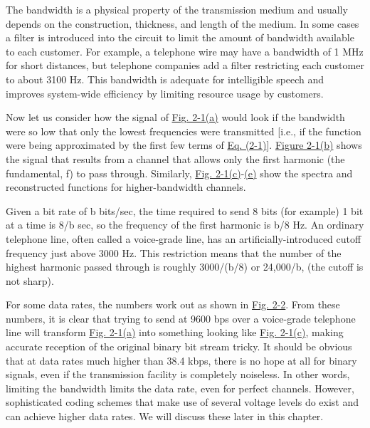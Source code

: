 \documentclass[b5paper,11pt]{memoir}
\begin{document}
The bandwidth is a physical property of the transmission medium and
usually depends on the construction, thickness, and length of the
medium. In some cases a filter is introduced into the circuit to limit
the amount of bandwidth available to each customer. For example, a
telephone wire may have a bandwidth of 1 MHz for short distances, but
telephone companies add a filter restricting each customer to about 3100
Hz. This bandwidth is adequate for intelligible speech and improves
system-wide efficiency by limiting resource usage by customers.

Now let us consider how the signal of
\protect\hyperlink{0130661023_ch02lev1sec1.htmlux5cux23ch02fig01}{Fig.
2-1(a)} would look if the bandwidth were so low that only the lowest
frequencies were transmitted {[}i.e., if the function were being
approximated by the first few terms of
\protect\hyperlink{0130661023_ch02lev1sec1.htmlux5cux23ch02eq01}{Eq.
(2-1)}{]}.
\protect\hyperlink{0130661023_ch02lev1sec1.htmlux5cux23ch02fig01}{Figure
2-1(b)} shows the signal that results from a channel that allows only
the first harmonic (the fundamental, {f}) to pass through. Similarly,
\protect\hyperlink{0130661023_ch02lev1sec1.htmlux5cux23ch02fig01}{Fig.
2-1(c)}-\protect\hyperlink{0130661023_ch02lev1sec1.htmlux5cux23ch02fig01}{(e)}
show the spectra and reconstructed functions for higher-bandwidth
channels.

Given a bit rate of {b} bits/sec, the time required to send 8 bits (for
example) 1 bit at a time is 8{/b} sec, so the frequency of the first
harmonic is {b/}8 Hz. An ordinary telephone line, often called a
{voice-grade line}, has an artificially-introduced cutoff frequency just
above 3000 Hz. This restriction means that the number of the highest
harmonic passed through is roughly 3000{/}({b/}8) or 24,000{/b}, (the
cutoff is not sharp).

For some data rates, the numbers work out as shown in
\protect\hyperlink{0130661023_ch02lev1sec1.htmlux5cux23ch02fig02}{Fig.
2-2}. From these numbers, it is clear that trying to send at 9600 bps
over a voice-grade telephone line will transform
\protect\hyperlink{0130661023_ch02lev1sec1.htmlux5cux23ch02fig01}{Fig.
2-1(a)} into something looking like
\protect\hyperlink{0130661023_ch02lev1sec1.htmlux5cux23ch02fig01}{Fig.
2-1(c)}, making accurate reception of the original binary bit stream
tricky. It should be obvious that at data rates much higher than 38.4
kbps, there is no hope at all for {binary} signals, even if the
transmission facility is completely noiseless. In other words, limiting
the bandwidth limits the data rate, even for perfect channels. However,
sophisticated coding schemes that make use of several voltage levels do
exist and can achieve higher data rates. We will discuss these later in
this chapter.
\end{document}
